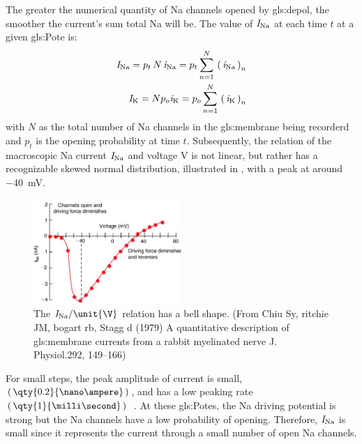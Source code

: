 \documentclass[class={myRUCProject}, crop=false]{standalone}
\begin{document}
The greater the numerical quantity of \gls{Na} channels opened by \gls{gls:depol}, the smoother the current's sum total \gls{Na} will be. 
The value of \(\mathit{I}_\mathrm{Na}\) at each time \(t\) at a given \gls{gls:Pote} is: 
\begin{align}
    \mathit{I}_\mathrm{Na} = p_t \, N \, \mathit{i}_\mathrm{Na} = p_t \sum^N_{n=1} \, \left(\,\mathit{i}_\mathrm{Na}\,\right)_n \label{eq:nasum}\\
    \mathit{I}_\mathrm{K} = N p_o \mathit{i}_\mathrm{K} = p_o \sum^N_{n=1} \, \left(\,\mathit{i}_\mathrm{K}\,\right)_n \label{eq:ksum}
\end{align}
with \(N\) as the total number of \gls{Na} channels in the \gls{gls:membrane} being recorderd and \(p_t\) is the opening probability at time \(t\). 
Subsequently, the relation of the macroscopic \gls{Na} current \(\mathit{I}_\mathrm{Na}\) and voltage \(\unit{\V}\) is not linear, but rather has a recognizable skewed normal distribution, illustrated in , with a peak at around \qty{-40}{\mV}. 
\begin{figure}[H]
  \centering
  \includegraphics[width=0.5\textwidth]{Pictures//Anakin/I-V.bell.png}
  \caption{The \(\curr\sodium/\unit{\V}\) relation has a bell shape. (From Chiu Sy, ritchie JM, bogart rb, Stagg d (1979) A quantitative description of \gls{gls:membrane} currents from a rabbit myelinated nerve J. Physiol.292, 149–166)}\label{fig:IVdist.}
\end{figure}
 
For small steps, the peak amplitude of current is small, \(\br{\qty{0.2}{\nano\ampere}}\), and has a low peaking rate \(\br{\qty{1}{\milli\second}}\)~\cite{Hammond2015ch4}. At these \glspl{gls:Pote}, the \gls{Na} driving potential is strong but the \gls{Na} channels have a low probability of opening. Therefore, \(\mathit{I}_\mathrm{Na}\) is small since it represents the current through a small number of open \gls{Na} channels. 
\end{document}
